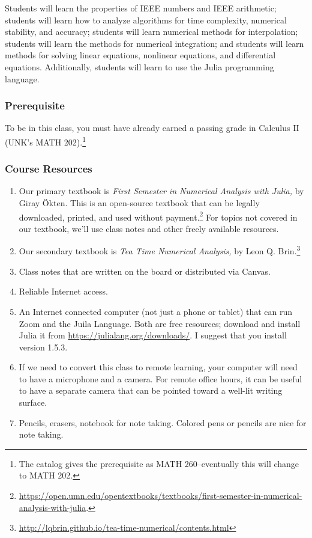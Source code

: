 \documentclass[12pt,fullpage]{article}
\newcounter{ex}\setcounter{ex}{0}
\begin{document}
 Students will learn the properties of IEEE numbers and IEEE arithmetic; students will learn how to analyze algorithms for time complexity, numerical stability,  and accuracy; students will learn numerical methods
for interpolation;  students will learn the methods for numerical integration;  and students will learn methods for solving linear equations, nonlinear equations, and differential equations. Additionally, students will learn to 
use the Julia programming language.

\subsubsection*{Prerequisite}

To be in this class, you must have already earned a passing grade in Calculus II (UNK's MATH 202).\footnote{The catalog gives the prerequisite as MATH 260--eventually this will change to MATH 202.}

\subsubsection*{Course Resources}

\begin{enumerate}

\item Our primary textbook is \emph{First Semester in Numerical Analysis with Julia,} by Giray Ökten.  This is an open-source textbook that can be legally downloaded, printed, and  used without payment.\footnote{\tiny \url{https://open.umn.edu/opentextbooks/textbooks/first-semester-in-numerical-analysis-with-julia}.  \normalsize} For topics not covered in our textbook, we'll use class notes and other freely available resources.

\item Our secondary textbook is \emph{Tea Time Numerical Analysis,} by Leon Q. Brin.\footnote{ \tiny \url{http://lqbrin.github.io/tea-time-numerical/contents.html} \normalsize}

\item Class notes that are written on the board or distributed via Canvas.


\item Reliable Internet access.

\item  An Internet connected computer (not just a phone or tablet) that can run Zoom and  the Juila Language.  Both are free resources; download and install Julia it from \url{https://julialang.org/downloads/}.  I suggest that you install version 1.5.3.

\item If we need to convert this class to remote learning, your computer will need to have a microphone and a camera. For remote office hours, it can be useful to have a separate camera that can be pointed toward a well-lit writing surface.


\item Pencils, erasers, notebook for note taking. Colored pens or pencils are nice for note taking.


 \end{enumerate}
\end{document}
